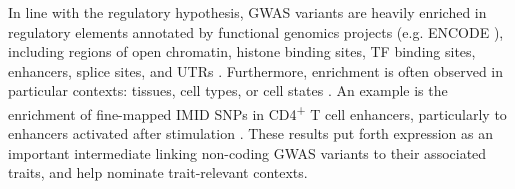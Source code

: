 \begin{outline}
In line with the regulatory hypothesis, \gls{GWAS} variants are heavily enriched in regulatory elements annotated by functional genomics projects (e.g. ENCODE \autocite{theencodeprojectconsortium2012IntegratedEncyclopediaDNA}), including
    regions of open chromatin, 
    histone binding sites, 
    \gls{TF} binding sites,
    enhancers,
    splice sites,
    and \glspl{UTR}
    \autocite{schaub2012LinkingDiseaseAssociations,maurano2012SystematicLocalizationCommon,farh2015GeneticEpigeneticFine,trynka2015DisentanglingEffectsColocalizing,nasser2020GenomewideMapsEnhancer}.
Furthermore, enrichment is often observed in particular contexts: tissues, cell types, or cell states \autocite{visscher201710YearsGWAS,gallagher2018PostGWASEraAssociation,cano-gamez2020GWASFunctionUsing}.
An example is the enrichment of fine-mapped \gls{IMID} \glspl{SNP} in CD4\textsuperscript{+} T cell enhancers, particularly to enhancers activated after stimulation \autocite{farh2015GeneticEpigeneticFine}.
These results put forth expression as an important intermediate linking non-coding \gls{GWAS} variants to their associated traits, 
and help nominate trait-relevant contexts.


\end{outline}
